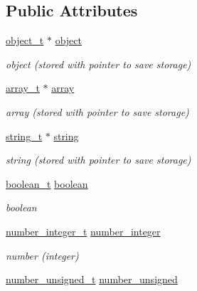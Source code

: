 \subsection*{Public Attributes}
\begin{DoxyCompactItemize}
\item 
\hyperlink{classnlohmann_1_1basic__json_a0322396ca5cd4623bc816bf735377623}{object\+\_\+t} $\ast$ \hyperlink{unionnlohmann_1_1basic__json_1_1json__value_a4a2209bb26e7088cd36bf24824ab5521}{object}
\begin{DoxyCompactList}\small\item\em object (stored with pointer to save storage) \end{DoxyCompactList}\item 
\hyperlink{classnlohmann_1_1basic__json_a4c409f1b6d9caf3412c78af9a5883fed}{array\+\_\+t} $\ast$ \hyperlink{unionnlohmann_1_1basic__json_1_1json__value_a7947687f3ae1911d6e9847e2b3226157}{array}
\begin{DoxyCompactList}\small\item\em array (stored with pointer to save storage) \end{DoxyCompactList}\item 
\hyperlink{classnlohmann_1_1basic__json_a61f8566a1a85a424c7266fb531dca005}{string\+\_\+t} $\ast$ \hyperlink{unionnlohmann_1_1basic__json_1_1json__value_a9856fb4271b50d738e14c5a9a2f05118}{string}
\begin{DoxyCompactList}\small\item\em string (stored with pointer to save storage) \end{DoxyCompactList}\item 
\hyperlink{classnlohmann_1_1basic__json_a4c919102a9b4fe0d588af64801436082}{boolean\+\_\+t} \hyperlink{unionnlohmann_1_1basic__json_1_1json__value_afd0f8ec00c40301efffd01a276959371}{boolean}
\begin{DoxyCompactList}\small\item\em boolean \end{DoxyCompactList}\item 
\hyperlink{classnlohmann_1_1basic__json_a98e611d67b7bd75307de99c9358ab2dc}{number\+\_\+integer\+\_\+t} \hyperlink{unionnlohmann_1_1basic__json_1_1json__value_afa3c414445aeffb56a7c6926f9420941}{number\+\_\+integer}
\begin{DoxyCompactList}\small\item\em number (integer) \end{DoxyCompactList}\item 
\hyperlink{classnlohmann_1_1basic__json_ab906e29b5d83ac162e823ada2156b989}{number\+\_\+unsigned\+\_\+t} \hyperlink{unionnlohmann_1_1basic__json_1_1json__value_a0299a6aa3bc4d45d54130e52970f73d3}{number\+\_\+unsigned}

\end{DoxyCompactItemize}
